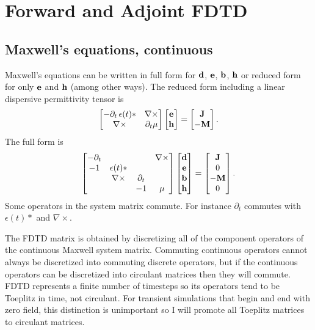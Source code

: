 \chapter{Forward and Adjoint FDTD}
\label{chap:fdtd}

\section{Maxwell's equations, continuous}

Maxwell's equations can be written in full form for $\textbf{d}$, $\textbf{e}$, $\textbf{b}$, $\textbf{h}$ or reduced form for only $\textbf{e}$ and $\textbf{h}$ (among other ways).  The reduced form including a linear dispersive permittivity tensor is
%
\begin{equation}
\begin{bmatrix}
-\partial_t \, \epsilon(t) \ast & \nabla \times \\
\nabla \times & \partial_t \mu
\end{bmatrix}
\begin{bmatrix} \textbf{e} \\ \textbf{h} \end{bmatrix}
=
\begin{bmatrix}
\textbf{J} \\ -\textbf{M}
\end{bmatrix}.
\end{equation}
%
The full form is
%
\begin{equation}
\begin{bmatrix}
-\partial_t & & & \nabla \times \\
-1 & \epsilon(t) \ast & & \\
& \nabla \times & \partial_t & \\
& & -1 & \mu
\end{bmatrix}
\begin{bmatrix} \textbf{d} \\ \textbf{e} \\ \textbf{b} \\ \textbf{h} \end{bmatrix}
=
\begin{bmatrix} \textbf{J} \\ 0 \\ -\textbf{M} \\ 0 \end{bmatrix}.
\end{equation}
%
Some operators in the system matrix commute.  For instance $\partial_t$ commutes with $\epsilon(t) \ast$ and $\nabla \times$.

The FDTD matrix is obtained by discretizing all of the component operators of the continuous Maxwell system matrix.  Commuting continuous operators cannot always be discretized into commuting discrete operators, but if the continuous operators can be discretized into circulant matrices then they will commute.  FDTD represents a finite number of timesteps so its operators tend to be Toeplitz in time, not circulant.  For transient simulations that begin and end with zero field, this distinction is unimportant so I will promote all Toeplitz matrices to circulant matrices.

